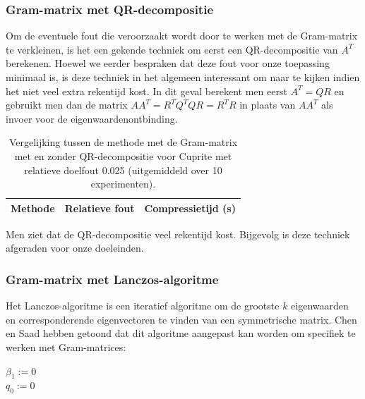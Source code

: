 \subsubsection{Gram-matrix met QR-decompositie}

Om de eventuele fout die veroorzaakt wordt door te werken met de Gram-matrix te verkleinen, is het een gekende techniek om eerst een QR-decompositie van $A^T$ berekenen. Hoewel we eerder bespraken dat deze fout voor onze toepassing minimaal is, is deze techniek in het algemeen interessant om naar te kijken indien het niet veel extra rekentijd kost. In dit geval berekent men eerst $A^T = QR$ en gebruikt men dan de matrix $A A^T = R^T Q^T Q R = R^T R$ in plaats van $A A^T$ als invoer voor de eigenwaardenontbinding.\\

\begin{table}[H]
\centering
\begin{tabular}{|l|l|l|}
\hline
Methode & Relatieve fout & Compressietijd (s)\\ \hline

\end{tabular}
\caption{Vergelijking tussen de methode met de Gram-matrix met en zonder QR-decompositie voor Cuprite met relatieve doelfout 0.025 (uitgemiddeld over 10 experimenten).}
\end{table}
Men ziet dat de QR-decompositie veel rekentijd kost. Bijgevolg is deze techniek afgeraden voor onze doeleinden.

\subsubsection{Gram-matrix met Lanczos-algoritme}

Het Lanczos-algoritme \cite{ref:lanczos} is een iteratief algoritme om de grootste $k$ eigenwaarden en corresponderende eigenvectoren te vinden van een symmetrische matrix. Chen en Saad \cite{ref:saad} hebben getoond dat dit algoritme aangepast kan worden om specifiek te werken met Gram-matrices:\\

\begin{algorithm}[H]
$\beta_1 := 0$\\
$q_0 := 0$\\
\end{algorithm}

